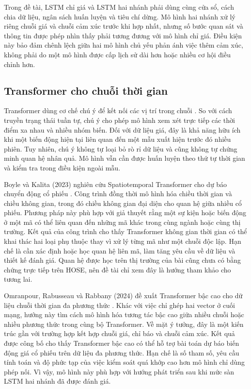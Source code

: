 Trong đề tài, LSTM chỉ giá và LSTM hai nhánh phải dùng cùng cửa sổ, cách chia dữ liệu,
ngân sách huấn luyện và tiêu chí dừng. Mô hình hai nhánh xử lý riêng chuỗi giá và
chuỗi cảm xúc trước khi hợp nhất, nhưng số bước quan sát và thông tin được phép
nhìn thấy phải tương đương với mô hình chỉ giá. Điều kiện này bảo đảm chênh lệch
giữa hai mô hình chủ yếu phản ánh việc thêm cảm xúc, không phải do một mô hình được
cấp lịch sử dài hơn hoặc nhiều cơ hội điều chỉnh hơn.

\subsection{Transformer cho chuỗi thời gian}

Transformer dùng cơ chế chú ý để kết nối các vị trí trong chuỗi
\cite{Vaswani2017_attention}. So với cách truyền
trạng thái tuần tự, chú ý cho phép mô hình xem xét trực tiếp các thời điểm xa nhau
và nhiều nhóm biến. Đối với dữ liệu giá, đây là khả năng hữu ích khi một biến động hiện
tại liên quan đến một mẫu xuất hiện trước đó nhiều phiên. Tuy nhiên, chú ý không
tự loại bỏ rò rỉ dữ liệu và cũng không tự chứng minh quan hệ nhân quả. Mô hình vẫn cần
được huấn luyện theo thứ tự thời gian và kiểm tra trong điều kiện ngoài mẫu.

Boyle và Kalita (2023) nghiên cứu Spatiotemporal Transformer cho dự báo chuyển động
cổ phiếu \cite{Boyle2023_230503835v1}. Công trình đồng thời mô hình hóa chiều thời gian
và chiều không gian, trong đó chiều không gian đại diện cho quan hệ giữa nhiều cổ
phiếu. Phương pháp này phù hợp với giả thuyết rằng một sự kiện hoặc biến động ở một
mã có thể liên quan đến những mã khác trong cùng ngành hoặc cùng thị trường. Kết quả
của công trình cho thấy Transformer không gian thời gian có thể khai thác hai loại
phụ thuộc thay vì xử lý từng mã như một chuỗi độc lập. Hạn chế là cần xác định hoặc
học quan hệ liên mã, làm tăng yêu cầu về dữ liệu và thiết kế đánh giá. Quan hệ được
học trên thị trường của bài cũng chưa có bằng chứng trực tiếp trên HOSE, nên đề tài
chỉ xem đây là hướng tham khảo cho tương lai.

Omranpour, Rabusseau và Rabbany (2024) đề xuất Transformer bậc cao cho dữ liệu
chuỗi thời gian đa phương thức \cite{Omranpour2024_241210540v1}. Khác với việc chỉ
ghép hai vector ở cuối mạng, hướng này tìm cách mô hình hóa tương tác bậc cao giữa
nhiều chuỗi hoặc nhiều phương thức trong cùng bộ Transformer. Về mặt ý tưởng, đây là
một kiến trúc gần với trường hợp kết hợp chuỗi giá, chỉ báo và chuỗi cảm xúc. Kết
quả được công bố cho thấy Transformer bậc cao có thể hỗ trợ bài toán dự báo biến động giá cổ phiếu trên dữ liệu đa phương thức. Hạn chế là số tham số, yêu cầu tính
toán và độ phức tạp của việc kiểm soát quá khớp cao hơn mô hình chỉ dùng phép nối. Vì vậy, mô hình
này phù hợp với hướng phát triển sau khi mức sàn LSTM hai nhánh đã được đánh giá.

